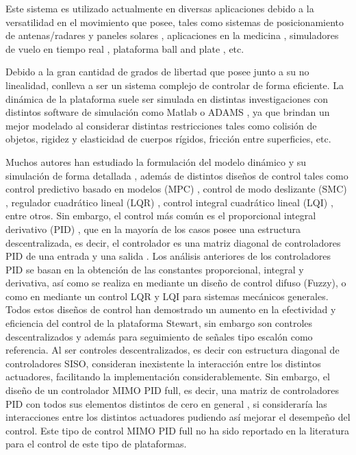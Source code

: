 Este sistema es utilizado actualmente en diversas aplicaciones debido a la versatilidad en el movimiento que posee, tales como sistemas de posicionamiento de antenas/radares y paneles solares \cite{lin2006disturbance,keshtkar2016adaptive}, aplicaciones en la medicina \cite{boian2004dual,girone2001stewart}, simuladores de vuelo en tiempo real \cite{pradipta2013development, huang2017incremental}, plataforma ball and plate \cite{bang2018ballandplate,kassem2015ballandplatecomparison}, etc. 

Debido a la gran cantidad de grados de libertad que posee junto a su no linealidad, conlleva a ser un sistema complejo de controlar de forma eficiente. La dinámica de la plataforma suele ser simulada en distintas investigaciones con distintos software de simulación como Matlab o ADAMS \cite{tajdari2021discrete,liu2023fuzzy}, ya que brindan un mejor modelado al considerar distintas restricciones tales como colisión de objetos, rigidez y elasticidad de cuerpos rígidos, fricción entre superficies, etc. 

Muchos autores han estudiado la formulación del modelo dinámico y su simulación de forma detallada \cite{bingul2012modeling}, además de distintos diseños de control tales como control predictivo basado en modelos (MPC) \cite{nadimi2006model}, control de modo deslizante (SMC) \cite{jouini2013modeling,chalanga2015smooth}, regulador cuadrático lineal (LQR) \cite{rossell2015tracking}, control integral cuadrático lineal (LQI) \cite{tajdari2021discrete}, entre otros. Sin embargo, el control más común es el proporcional integral derivativo (PID) \cite{liu2023fuzzy,yang2008modeling,csumnu2017motor}, que en la mayoría de los casos posee una estructura descentralizada, es decir, el controlador es una matriz diagonal de controladores PID de una entrada y una salida \cite{astrom19951pidcontrollers,skogestad2005multivariable}.
Los análisis anteriores de los controladores PID se basan en la obtención de las constantes proporcional, integral y derivativa, así como se realiza en \cite{liu2023fuzzy} mediante un diseño de control difuso (Fuzzy), o como en \cite{silva2006lqr} mediante un control LQR y LQI para sistemas mecánicos generales. Todos estos diseños de control han demostrado un aumento en la efectividad y eficiencia del control de la plataforma Stewart, sin embargo son controles descentralizados \cite{albertos2006multivariable} y además para seguimiento de señales tipo escalón como referencia. Al ser controles descentralizados, es decir con estructura diagonal de controladores SISO, consideran inexistente la interacción entre los distintos actuadores, facilitando la implementación considerablemente. Sin embargo, el diseño de un controlador MIMO PID full, es decir, una matriz de controladores PID con todos sus elementos distintos de cero en general \cite{albertos2006multivariable}, si consideraría las interacciones entre los distintos actuadores pudiendo así mejorar el desempeño del control. Este tipo de control MIMO PID full no ha sido reportado en la literatura para el control de este tipo de plataformas.

